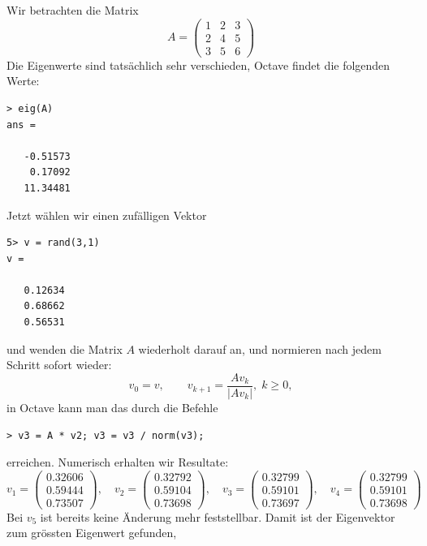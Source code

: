 \begin{beispiel}
Wir betrachten die Matrix 
\[
A=\begin{pmatrix}
1&2&3\\
2&4&5\\
3&5&6
\end{pmatrix}
\]
Die Eigenwerte sind tatsächlich sehr verschieden, Octave findet
die folgenden Werte:
\begin{verbatim}
> eig(A)
ans =

   -0.51573
    0.17092
   11.34481
\end{verbatim}
Jetzt wählen wir einen zufälligen Vektor
\begin{verbatim}
5> v = rand(3,1)
v =

   0.12634
   0.68662
   0.56531
\end{verbatim}
und wenden die Matrix $A$ wiederholt darauf an, und normieren nach
jedem Schritt sofort wieder:
\[
v_0 = v,\qquad v_{k+1}=\frac{Av_k}{|Av_k|},\; k\ge 0,
\]
in Octave kann man das durch die Befehle
\begin{verbatim}
> v3 = A * v2; v3 = v3 / norm(v3);
\end{verbatim}
erreichen.
Numerisch erhalten wir Resultate:
\[
v_1=\begin{pmatrix}
   0.32606\\
   0.59444\\
   0.73507
\end{pmatrix}
,\quad
v_2=\begin{pmatrix}
   0.32792\\
   0.59104\\
   0.73698
\end{pmatrix}
,\quad
v_3=\begin{pmatrix}
   0.32799\\
   0.59101\\
   0.73697
\end{pmatrix}
,\quad
v_4=\begin{pmatrix}
   0.32799\\
   0.59101\\
   0.73698
\end{pmatrix}
\]
Bei $v_5$ ist bereits keine Änderung mehr feststellbar.
Damit ist der Eigenvektor zum grössten Eigenwert gefunden, 
\end{beispiel}

